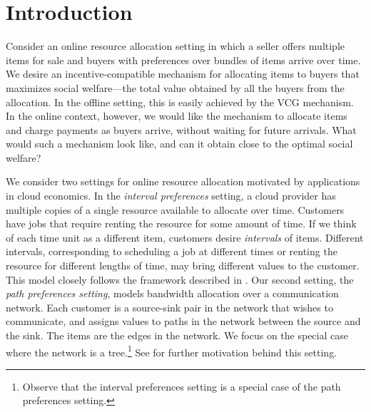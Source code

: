 \section{Introduction}

Consider an online resource allocation setting in which a seller offers
multiple items for sale and buyers with preferences over bundles of items
arrive over time. We desire an incentive-compatible mechanism for allocating
items to buyers that maximizes social welfare---the total value obtained by
all the buyers from the allocation. In the offline setting, this is easily
achieved by the VCG mechanism. In the online context, however, we would like
the mechanism to allocate items and charge payments as buyers arrive, without
waiting for future arrivals.  What would such a mechanism look like, and can it
obtain close to the optimal social welfare?

We consider two settings for online resource allocation motivated by
applications in cloud economics. In the {\em interval preferences} setting, a
cloud provider has multiple copies of a single resource available to allocate
over time. Customers have jobs that require renting the resource for some
amount of time. If we think of each time unit as a different item,
customers desire {\em intervals} of items. Different intervals,
corresponding to scheduling a job at different times or renting the resource
for different lengths of time, may bring different values to the customer. This
model closely follows the framework described in \cite{babaioff2017era}. Our
second setting, the {\em path preferences setting}, models bandwidth allocation
over a communication network. Each customer is a source-sink pair in the
network that wishes to communicate, and assigns values to paths in the network
between the source and the sink. The items are the edges in the network. We
focus on the special case where the network is a tree.\footnote{Observe that
  the interval preferences setting is a special case of the path preferences
  setting.} See \cite{Jalaparti2016} for further motivation behind this
setting.

